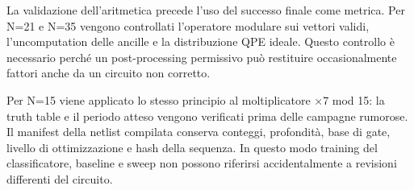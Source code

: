 La validazione dell'aritmetica precede l'uso del successo finale come metrica. Per N=21 e N=35 vengono controllati l'operatore modulare sui vettori validi, l'uncomputation delle ancille e la distribuzione QPE ideale. Questo controllo è necessario perché un post-processing permissivo può restituire occasionalmente fattori anche da un circuito non corretto.

Per N=15 viene applicato lo stesso principio al moltiplicatore ×7 mod 15: la truth table e il periodo atteso vengono verificati prima delle campagne rumorose. Il manifest della netlist compilata conserva conteggi, profondità, base di gate, livello di ottimizzazione e hash della sequenza. In questo modo training del classificatore, baseline e sweep non possono riferirsi accidentalmente a revisioni differenti del circuito.

\begingroup
\small

